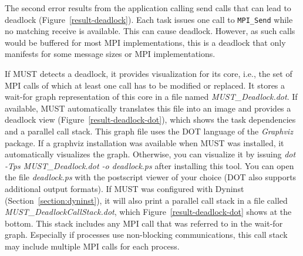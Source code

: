 \documentclass[english]{scrartcl}
\begin{document}

The second error results from the application calling send calls that can lead
to deadlock (Figure~\ref{result-deadlock}). Each task issues one call to
\texttt{MPI\_Send} while no matching receive is available. This can cause
deadlock. However, as such calls would be buffered for most MPI implementations, this is a deadlock that only manifests
for some message sizes or MPI implementations. 
 

If MUST detects a deadlock, it provides visualization for its core, i.e., the
set of MPI calls of which at least one call has to be modified or replaced.
It stores a wait-for graph representation of this core in a file named
\emph{MUST\_Deadlock.dot}. 
If available, MUST automatically translates this file into an image and provides
a deadlock view (Figure~\ref{result-deadlock-dot}), which shows the task
dependencies and a parallel call stack.
This graph file uses the DOT language of the
\emph{Graphviz} package. 
If a graphviz installation was available when
MUST was installed, it automatically visualizes the
graph. Otherwise, you can visualize it by issuing \emph{dot -Tps
MUST\_Deadlock.dot -o deadlock.ps} after installing this tool.
You can open the file \emph{deadlock.ps} with the postscript viewer of your choice (DOT also supports additional output formats).
If MUST was
configured with Dyninst (Section~\ref{section:dyninst}), it will also print a
parallel call stack in a file called \emph{MUST\_DeadlockCallStack.dot}, which
Figure~\ref{result-deadlock-dot} shows at the bottom. This stack includes any
MPI call that was referred to in the wait-for graph. Especially if processes use
non-blocking communications, this call stack may include multiple MPI calls for
each process.
\end{document}
